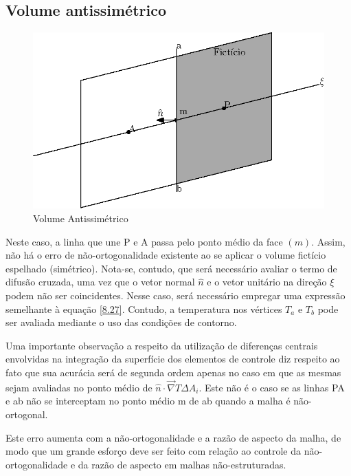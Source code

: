 \subsection{Volume antissimétrico}

\begin{figure}[]
    \centering
    \includegraphics{fig/contorno-2.eps}
    \caption{Volume Antissimétrico}
    \label{contorno-2}
\end{figure}

Neste caso, a linha que une P e A passa pelo ponto médio da face $(m)$. Assim, não há o erro de não-ortogonalidade existente ao se aplicar o volume fictício espelhado (simétrico). Nota-se, contudo, que será necessário avaliar o termo de difusão cruzada, uma vez que o vetor normal $\hat{n}$ e o vetor unitário na direção $\xi$ podem não ser coincidentes. Nesse caso, será necessário empregar uma expressão semelhante à equação \ref{8.27}. Contudo, a temperatura nos vértices $T_a$ e $T_b$ pode ser avaliada mediante o uso das condições de contorno.

Uma importante observação a respeito da utilização de diferenças centrais envolvidas na integração da superfície dos elementos de controle diz respeito ao fato que sua acurácia será de segunda ordem apenas no caso em que as mesmas sejam avaliadas no ponto médio de $\hat{n} \cdot \vec{\nabla}T \Delta A_i$. Este não é o caso se as linhas PA e ab não se interceptam no ponto médio m de ab quando a malha é não-ortogonal.

Este erro aumenta com a não-ortogonalidade e a razão de aspecto da malha, de modo que um grande esforço deve ser feito com relação ao controle da não-ortogonalidade e da razão de aspecto em malhas não-estruturadas.
